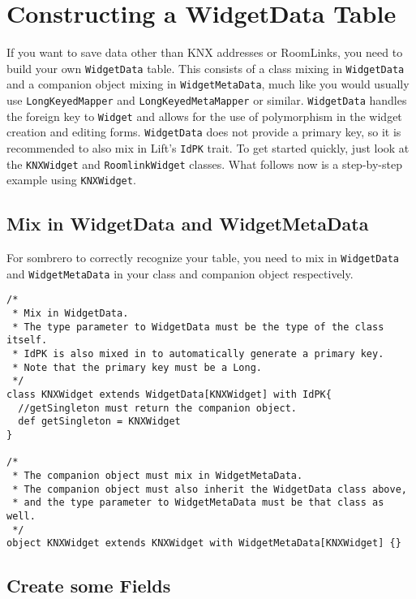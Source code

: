 \section{Constructing a WidgetData Table}

If you want to save data other than KNX addresses or RoomLinks, you need to build your own \lstinline!WidgetData! table. This consists of a class mixing in \lstinline!WidgetData! and a companion object mixing in \lstinline!WidgetMetaData!, much like you would usually use \lstinline!LongKeyedMapper! and \lstinline!LongKeyedMetaMapper! or similar. \lstinline!WidgetData! handles the foreign key to \lstinline!Widget! and allows for the use of polymorphism in the widget creation and editing forms. \lstinline!WidgetData! does not provide a primary key, so it is recommended to also mix in Lift's \lstinline!IdPK! trait. To get started quickly, just look at the \lstinline!KNXWidget! and \lstinline!RoomlinkWidget! classes. What follows now is a step-by-step example using \lstinline!KNXWidget!.

\subsection{Mix in WidgetData and WidgetMetaData}

For sombrero to correctly recognize your table, you need to mix in \lstinline!WidgetData! and \lstinline!WidgetMetaData! in your class and companion object respectively.

\begin{lstlisting}[caption=Mixing in!,label=lst:widgetdata:mixin]
/*
 * Mix in WidgetData.
 * The type parameter to WidgetData must be the type of the class itself.
 * IdPK is also mixed in to automatically generate a primary key.
 * Note that the primary key must be a Long.
 */
class KNXWidget extends WidgetData[KNXWidget] with IdPK{
  //getSingleton must return the companion object.
  def getSingleton = KNXWidget
}  

/*
 * The companion object must mix in WidgetMetaData.
 * The companion object must also inherit the WidgetData class above,
 * and the type parameter to WidgetMetaData must be that class as well.
 */
object KNXWidget extends KNXWidget with WidgetMetaData[KNXWidget] {}
\end{lstlisting}


\subsection{Create some Fields}

